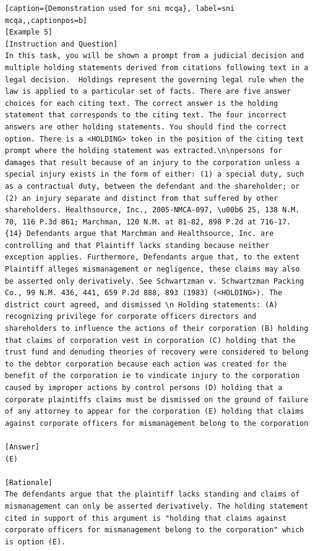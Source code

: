 \begin{lstlisting}[caption={Demonstration used for sni mcqa}, label=sni mcqa,,captionpos=b]
[Example 5]
[Instruction and Question]
In this task, you will be shown a prompt from a judicial decision and multiple holding statements derived from citations following text in a legal decision.  Holdings represent the governing legal rule when the law is applied to a particular set of facts. There are five answer choices for each citing text. The correct answer is the holding statement that corresponds to the citing text. The four incorrect answers are other holding statements. You should find the correct option. There is a <HOLDING> token in the position of the citing text prompt where the holding statement was extracted.\n\npersons for damages that result because of an injury to the corporation unless a special injury exists in the form of either: (1) a special duty, such as a contractual duty, between the defendant and the shareholder; or (2) an injury separate and distinct from that suffered by other shareholders. Healthsource, Inc., 2005-NMCA-097, \u00b6 25, 138 N.M. 70, 116 P.3d 861; Marchman, 120 N.M. at 81-82, 898 P.2d at 716-17. {14} Defendants argue that Marchman and Healthsource, Inc. are controlling and that Plaintiff lacks standing because neither exception applies. Furthermore, Defendants argue that, to the extent Plaintiff alleges mismanagement or negligence, these claims may also be asserted only derivatively. See Schwartzman v. Schwartzman Packing Co., 99 N.M. 436, 441, 659 P.2d 888, 893 (1983) (<HOLDING>). The district court agreed, and dismissed \n Holding statements: (A) recognizing privilege for corporate officers directors and shareholders to influence the actions of their corporation (B) holding that claims of corporation vest in corporation (C) holding that the trust fund and denuding theories of recovery were considered to belong to the debtor corporation because each action was created for the benefit of the corporation ie to vindicate injury to the corporation caused by improper actions by control persons (D) holding that a corporate plaintiffs claims must be dismissed on the ground of failure of any attorney to appear for the corporation (E) holding that claims against corporate officers for mismanagement belong to the corporation

[Answer]
(E)

[Rationale]
The defendants argue that the plaintiff lacks standing and claims of mismanagement can only be asserted derivatively. The holding statement cited in support of this argument is "holding that claims against corporate officers for mismanagement belong to the corporation" which is option (E).




\end{lstlisting}
